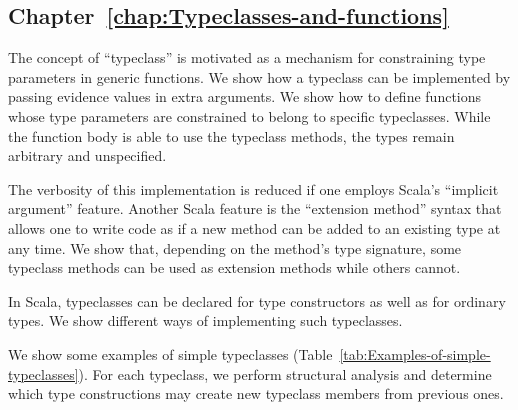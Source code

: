 \subsection{Chapter~\ref{chap:Typeclasses-and-functions}}

The concept of \textsf{``}typeclass\textsf{''} is motivated as a mechanism for constraining
type parameters in generic functions. We show how a typeclass can
be implemented by passing evidence values in extra arguments. We show
how to define functions whose type parameters are constrained to belong
to specific typeclasses. While the function body is able to use the
typeclass methods, the types remain arbitrary and unspecified.

The verbosity of this implementation is reduced if one employs Scala\textsf{'}s
\textsf{``}implicit argument\textsf{''} feature. Another Scala feature is the \textsf{``}extension
method\textsf{''} syntax that allows one to write code as if a new method
can be added to an existing type at any time. We show that, depending
on the method\textsf{'}s type signature, some typeclass methods can be used
as extension methods while others cannot.

In Scala, typeclasses can be declared for type constructors as well
as for ordinary types. We show different ways of implementing such
typeclasses.

We show some examples of simple typeclasses (Table~\ref{tab:Examples-of-simple-typeclasses}).
For each typeclass, we perform structural analysis and determine which
type constructions may create new typeclass members from previous
ones. 

